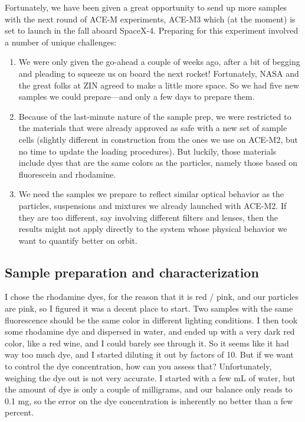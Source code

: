 Fortunately, we have been given a great opportunity to send up more samples with
the next round of ACE-M experiments, ACE-M3 which (at the moment) is set to
launch in the fall aboard SpaceX-4. Preparing for this experiment involved a
number of unique challenges:
\begin{enumerate}
\item We were only given the go-ahead a couple of weeks ago, after a bit of begging and pleading to squeeze us on board the next rocket! Fortunately, NASA and the great folks at ZIN agreed to make a little more space. So we had five new samples we could prepare---and only a few days to prepare them.
\item Because of the last-minute nature of the sample prep, we were restricted to the materials that were already approved as safe with a new set of sample cells (slightly different in construction from the ones we use on ACE-M2, but no time to update the loading procedures). But luckily, those materials include dyes that are the same colors as the particles, namely those based on fluorescein and rhodamine.
\item We need the samples we prepare to reflect similar optical behavior as the particles, suspensions and mixtures we already launched with ACE-M2. If they are too different, say involving different filters and lenses, then the results might not apply directly to the system whose physical behavior we want to quantify better on orbit.
\end{enumerate}

\subsection{Sample preparation and
characterization}\label{sample-preparation-and-characterization} 
I chose the rhodamine dyes, for the reason that it is red / pink, and our
particles are pink, so I figured it was a decent place to start. Two samples
with the same fluorescence should be the same color in different lighting
conditions. I then took some rhodamine dye and dispersed in water, and ended up
with a very dark red color, like a red wine, and I could barely see through it.
So it seems like it had way too much dye, and I started diluting it out by
factors of 10. But if we want to control the dye concentration, how can you
assess that? Unfortunately, weighing the dye out is not very accurate. I started
with a few mL of water, but the amount of dye is only a couple of milligrams,
and our balance only reads to 0.1 mg, so the error on the dye concentration is
inherently no better than a few percent.

